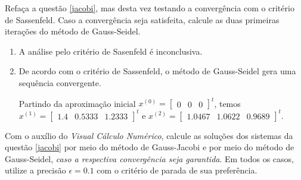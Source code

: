 \begin{ex}
\begin{sol}
\end{sol}
\end{ex}

\begin{ex}
Refaça a questão \ref{jacobi}, mas desta vez testando a convergência com o critério de Sassenfeld. Caso a convergência seja satisfeita, calcule as duas primeiras iterações do método de Gauss-Seidel.
\begin{sol}
\begin{enumerate}
\item A análise pelo critério de Sasenfeld é inconclusiva.
\item De acordo com o critério de Sassenfeld, o método de Gauss-Seidel gera uma sequência convergente.

Partindo da aproximação inicial $x^{(0)}=\begin{bmatrix}
0&0&0
\end{bmatrix}^t$, temos $x^{(1)}=\begin{bmatrix}
1.4& 0.5333 &1.2333
\end{bmatrix}^t$ e $x^{(2)}=\begin{bmatrix}
1.0467& 1.0622 &0.9689
\end{bmatrix}^t$.
\end{enumerate}
\end{sol}
\end{ex}


\begin{ex}
Com o auxílio do \emph{Visual Cálculo Numérico}, calcule as soluções dos sistemas da questão \ref{jacobi} por meio do método de Gauss-Jacobi e por meio do método de Gauss-Seidel, \emph{caso a respectiva convergência seja garantida}. Em todos os casos, utilize a precisão $\epsilon=0.1$ com o critério de parada de sua preferência.
\end{ex}

